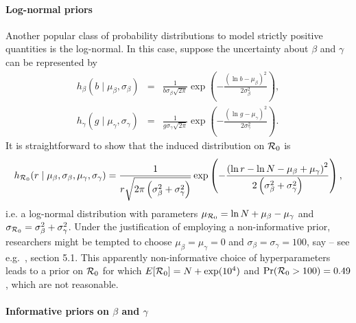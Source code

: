 \documentclass[alpha-refs]{wiley-article}
\newcommand{\rr}{ {\cal R}_0 }						%
\begin{document}
\paragraph{Log-normal priors}

Another popular class of probability distributions to model strictly positive quantities is the log-normal.
In this case, suppose the uncertainty about $\beta$ and $\gamma$ can be represented by
\begin{eqnarray*}
\nonumber
h_{\beta}(b \mid \mu_{\beta}, \sigma_{\beta}) &=& \frac{1}{b \sigma_{\beta}\sqrt{2\pi}} \exp\left( - \frac{ \left( \ln b - \mu_{\beta} \right)^2 }{2 \sigma_{\beta}^2} \right), \\
h_{\gamma}(g \mid \mu_{\gamma}, \sigma_{\gamma}) &=& \frac{1}{g \sigma_{\gamma}\sqrt{2\pi}} \exp\left( - \frac{ \left( \ln g - \mu_{\gamma} \right)^2 }{2 \sigma_{\gamma}^2} \right).
\end{eqnarray*}
It is straightforward to show that the induced distribution on $\rr$ is
\begin{equation}
 \label{eq:r0lognormal}
h_{\rr}( r \mid \mu_{\beta}, \sigma_{\beta}, \mu_{\gamma}, \sigma_{\gamma}) =   \frac{1}{r \sqrt{2\pi \left( \sigma_{\beta}^2 + \sigma_{\gamma}^2 \right) }} \exp\left( - \frac{ \left( \ln r - \ln N - \mu_{\beta} + \mu_{\gamma}  \right)^2 }{2 \left(\sigma_{\beta}^2 + \sigma_{\gamma}^2\right) } \right),
\end{equation}
i.e. a log-normal distribution with parameters $\mu_{\rr} = \ln N + \mu_{\beta} - \mu_{\gamma}$ and $\sigma_{\rr} = \sigma_{\beta}^2 + \sigma_{\gamma}^2$.
Under the justification of employing a non-informative prior, researchers might be tempted to choose $\mu_{\beta} = \mu_{\gamma} = 0$ and $ \sigma_{\beta} = \sigma_{\gamma} = 100$, say -- see e.g.~\cite{Ho2018}, section 5.1.
This apparently non-informative choice of hyperparameters leads to a prior on $\rr$ for which  $E[\rr ] = N + \exp(10^4)$ and $\text{Pr}(\rr > 100) = 0.49$, which are not reasonable.

\paragraph{Informative priors on $\beta$ and $\gamma$}
\end{document}
